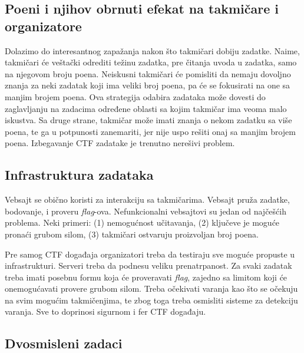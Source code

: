 \documentclass[12pt, a4paper, twocolumn]{article}
\begin{document}
\subsection{Poeni i njihov obrnuti efekat na takmičare i organizatore}

Dolazimo do interesantnog zapažanja nakon što takmičari dobiju zadatke.
Naime, takmičari će veštački odrediti težinu zadatka, pre čitanja uvoda u 
zadatka, samo na njegovom broju poena. Neiskusni takmičari će pomisliti
da nemaju dovoljno znanja za neki zadatak koji ima veliki broj poena, pa
će se fokusirati na one sa manjim brojem poena. Ova strategija odabira 
zadataka može dovesti do zaglavljanju na zadacima određene oblasti sa kojim
takmičar ima veoma malo iskustva. Sa druge strane, takmičar može imati
znanja o nekom zadatku sa više poena, te ga u potpunosti zanemariti, jer
nije uspo rešiti onaj sa manjim brojem poena. Izbegavanje CTF zadatake
je trenutno nerešivi problem.

\subsection{Infrastruktura zadataka}

Vebsajt se obično koristi za interakciju sa takmičarima. Vebsajt pruža 
zadatke, bodovanje, i proveru \emph{flag}-ova. Nefunkcionalni vebsajtovi
su jedan od najčešćih problema. Neki primeri: (1) nemogućnost učitavanja,
(2) ključeve je moguće pronaći grubom silom, (3) takmičari ostvaruju 
proizvoljan broj poena.

Pre samog CTF događaja organizatori treba da testiraju sve moguće
propuste u infrastrukturi. Serveri treba da podnesu veliku prenatrpanost.
Za svaki zadatak treba imati posebnu formu koja će proveravati \emph{flag},
zajedno sa limitom koji će onemogućavati provere grubom silom. Treba očekivati
varanja kao što se očekuju na svim mogućim takmičenjima, te zbog toga treba
osmisliti sisteme za detekciju varanja. Sve to doprinosi sigurnom i fer
CTF događaju.

\subsection{Dvosmisleni zadaci}
\end{document}

